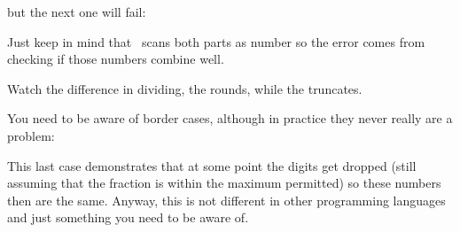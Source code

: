 \startbuffer
{}
\number\scratchdimen
\the\scratchdimen
\stopbuffer

\typebuffer[option=TEX]

\startlines
\getbuffer
\stoplines

but the next one will fail:

\starttyping[option=TEX]
\stoptyping

Just keep in mind that \TEX\ scans both parts as number so the error comes from
checking if those numbers combine well.

\startbuffer
\ifdim 16383.99999  pt = 16383.99998  pt the same \else different \fi
\ifdim 16383.999979 pt = 16383.999980 pt the same \else different \fi
\ifdim 16383.999987 pt = 16383.999991 pt the same \else different \fi
\stopbuffer

\typebuffer[option=TEX]

Watch the difference in dividing, the \type {/} rounds, while the \type {:}
truncates.

\startlines
\getbuffer
\stoplines

You need to be aware of border cases, although in practice they never really
are a problem:

\startbuffer
\ifdim \dimexpr16383.99997 pt/2\relax = \dimexpr 16383.99998 pt/2\relax
    the same \else different
\fi
\ifdim \dimexpr16383.99997 pt:2\relax = \dimexpr 16383.99998 pt:2\relax
    the same \else different
\fi
\stopbuffer

\typebuffer[option=TEX]

\startlines
\getbuffer
\stoplines

\startbuffer
\ifdim \dimexpr1.99997 pt/2\relax = \dimexpr 1.99998 pt/2\relax
    the same \else different
\fi
\ifdim \dimexpr1.99997 pt:2\relax = \dimexpr 1.99998 pt:2\relax
    the same \else different
\fi
\stopbuffer

\typebuffer[option=TEX]

\startlines
\getbuffer
\stoplines

\startbuffer
\ifdim \dimexpr1.999999 pt/2\relax = \dimexpr 1.9999995 pt/2\relax
    the same \else different
\fi
\ifdim \dimexpr1.999999 pt:2\relax = \dimexpr 1.9999995 pt:2\relax
    the same \else different
\fi
\stopbuffer

\typebuffer[option=TEX]

\startlines
\getbuffer
\stoplines

This last case demonstrates that at some point the digits get dropped (still
assuming that the fraction is within the maximum permitted) so these numbers then
are the same. Anyway, this is not different in other programming languages and
just something you need to be aware of.

